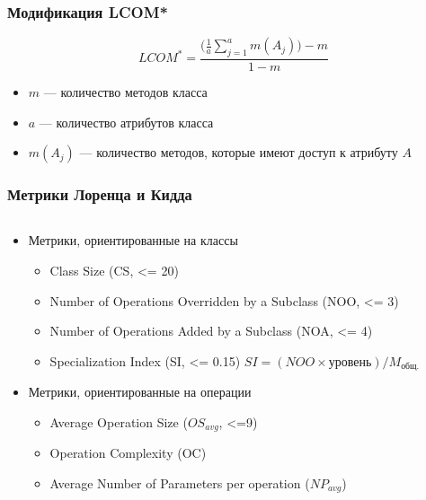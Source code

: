 \documentclass{../../slides-style}
\begin{document}
    \begin{frame}
        \frametitle{Модификация LCOM*}
        
        $$LCOM^* = \frac{\Biggl(\frac{1}{a}\sum\limits_{j=1}^{a}m(A_j)\Biggr) - m}{1 - m}$$

        \begin{itemize}
            \item $m$ --- количество методов класса
            \item $a$ --- количество атрибутов класса
            \item $m(A_j)$ --- количество методов, которые имеют доступ к атрибуту $A$
        \end{itemize}
    \end{frame}

    \begin{frame}
        \frametitle{Метрики Лоренца и Кидда}
        \begin{columns}
            \begin{column}{0.65\textwidth}
                \begin{itemize}
                    \item Метрики, ориентированные на классы
                    \begin{itemize}
                        \item Class Size (CS, <= 20)
                        \item Number of Operations Overridden by a Subclass (NOO, <= 3)
                        \item Number of Operations Added by a Subclass (NOA, <= 4)
                        \item Specialization Index (SI, <= 0.15)
                            $SI = (NOO \times \text{уровень}) / M_\text{общ.}$
                    \end{itemize}
                    \item Метрики, ориентированные на операции
                    \begin{itemize}
                        \item Average Operation Size ($OS_{avg}$, <=9)
                        \item Operation Complexity (OC)
                        \item Average Number of Parameters per operation ($NP_{avg}$)
                    \end{itemize}
                \end{itemize}
            \end{column}

\end{columns}
\end{frame}
\end{document}
